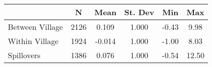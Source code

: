 \begin{tabular}{l*{5}{c}}\hline&\multicolumn{1}{c}{N}&\multicolumn{1}{c}{Mean}&\multicolumn{1}{c}{St. Dev}&\multicolumn{1}{c}{Min}&\multicolumn{1}{c}{Max}\\ \hline 
Between Village & 2126 & 0.109 & 1.000 & -0.43 & 9.98 \\
Within Village & 1924 & -0.014 & 1.000 & -1.00 & 8.03 \\
Spillovers & 1386 & 0.076 & 1.000 & -0.54 & 12.50 \\
\hline \end{tabular}
